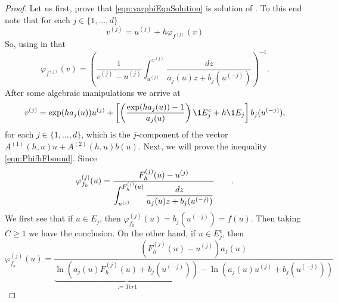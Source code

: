 \begin{proof}
	Let us first, prove that \eqref{eqn:varphiEqnSolution} is solution of . To this end note 
	that for each $j\in \{1,\dots, d\}$
	\begin{equation*}
		v^{(j)} = u^{(j)} + h \varphi_{f^{(j)}}(v)	
	\end{equation*}
	So, using in   that
	\begin{equation}
		\varphi_{f^{(j)}}(v) =
			\left(
				\frac{1}{v^{(j)}-u^{(j)}}
				\int 
				_{u^{(j)}}^{v^{(j)}}
				\frac{dz}
				{
					a_{j}(u) z
					+b_{j}(u^{(-j)})
				}
				\right)^{-1}.
	\end{equation} 
	After some algebraic manipulations we arrive at
%	
	\begin{equation}
		v^{(j)}= \exp(h a_j(u)) u^{(j)} + 
		\left[
			\left(
				\frac{\exp(ha_j(u))-1}{a_j(u)}
			\right)
			\1{E_j^c}
			+h \1{E_j}
		\right]b_{j}(u^{(-j)}),
	\end{equation}	
	for each $j\in \{1,\dots, d\}$, which is the $j$-component of the vector
	$A^{(1)}(h,u)u +A^{(2)}(h,u) b(u)$.
	Next, we will prove the inequality \eqref{eqn:PhifhFbound}. Since 
	$$
		\varphi_{f_h}^{(j)}(u) = 
			\frac{
				F_h^{(j)}(u)-u^{(j)}
			}%
			{%
				\displaystyle
				\int_{u^{(j)}}^{F_h^{(j)}(u)}
				\frac{dz}{a_j(u)z + b_j(u^{(-j)})}
			} \qquad.
	$$
	We first see that if $u\in E_j$, then 
	$
		\varphi_{f_h}^{(j)}(u) = b_j(u^{(-j)}) = f(u).
	$
	Then taking $C\geq 1$ we have the conclusion.
	On the other hand, if $u\in E_j^c$, then
	\begin{equation}\label{eqn:VarPhiEjc}
		\varphi_{f_h}^{(j)}(u) =
		\frac{
				(F_h^{(j)}(u)-u^{(j)}) a_j(u)
			}
			{
				\underbrace{
				\ln \left(
					a_j(u) F_h^{(j)}(u) + b_j(u^{(-j)})
				\right)
				}_{:=Ter1}
				-
				\ln \left(
					a_j(u) u^{(j)} + b_j(u^{(-j)})
				\right)
			}		
	\end{equation}

\end{proof}
